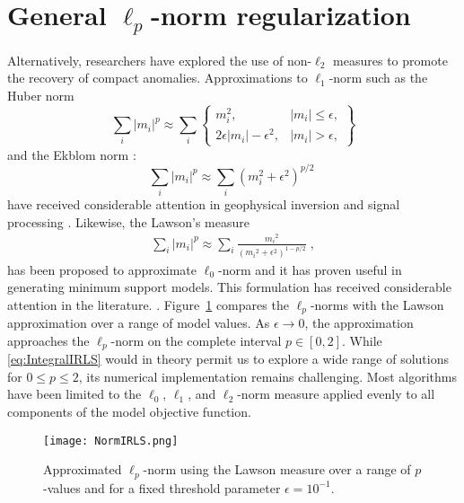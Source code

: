 \section{General $\ell_p$-norm regularization}
Alternatively, researchers have explored the use of non-$\ell_2$ measures to promote the recovery of compact anomalies. Approximations to $\ell_1$-norm such as the Huber norm \cite[]{Huber64}
\[
\sum_{i} {|m_i|}^p \approx \sum_{i} \left\{\begin{array}{lr}
m_i^2, & |m_i| \leq \epsilon,\\
2\epsilon|m_i|-\epsilon^2, & |m_i| > \epsilon,
\end{array}\right\}
\]
and the Ekblom norm \cite[]{Ekblom73}:
\begin{equation}\label{Ekblom}
\sum_{i} {|m_i |}^p \approx \sum_{i} {(m_i^2 + \epsilon^2)}^{p/2} \;
\end{equation}
have received considerable attention in geophysical inversion and signal processing \cite[]{Li93, Gorodnitsky97, FarquharsonOldenburg98, Daubechies10, SunLi14}.
Likewise, the Lawson's measure \cite[]{Lawson61}
\begin{equation}\label{eq:IntegralIRLS}
\begin{split}
	\sum_{i} {|m_i |}^p \approx \sum_{i} {\frac{ {m_i}^2}{\left( {{m_i}}^{2} + \epsilon^2 \right)^{1-p/2 }}} \;,	
\end{split}
\end{equation}
has been proposed to approximate $\ell_0$-norm and it has proven useful in generating minimum support models. This formulation has received considerable attention in the literature. \cite[]{Portniaguine1999, LastKubik83,BarbosaSilva94, Ajo-Franklin07}.
Figure~\ref{NormIRLS} compares the $\ell_p$-norms with the Lawson approximation over a range of model values. As $\epsilon \rightarrow 0$, the approximation approaches the $\ell_p$-norm on the complete interval $p \in [0, 2]$.
While \eqref{eq:IntegralIRLS} would in theory permit us to explore a wide range of solutions for $0\leq p\leq 2$, its numerical implementation remains challenging. Most algorithms have been limited to the $\ell_0$, $\ell_1$, and $\ell_2$-norm measure applied evenly to all components of the model objective function.
\begin{figure}
\texttt{[image: NormIRLS.png]}
\caption{Approximated $\ell_p$-norm using the Lawson measure \cite[]{Lawson61} over a range of $p$-values and for a fixed threshold parameter $\epsilon=10^{-1}$.}
\label{NormIRLS}
\end{figure}

